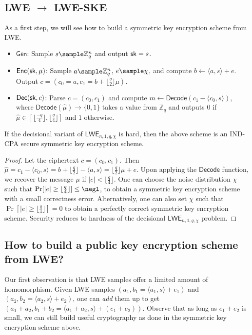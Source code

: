 \documentclass[12pt]{tufte-book}
\newcommand{\Gen}{\mathsf{Gen}}
\newcommand{\Enc}{\mathsf{Enc}}
\newcommand{\Dec}{\mathsf{Dec}}
\newcommand{\LWE}{\mathsf{LWE}} \usepackage{booktabs}
\begin{document}
\subsection{LWE $\to$ LWE-SKE}
As a first step, we will see how to build a symmetric key encryption scheme from LWE.

\begin{itemize}
    \item $\Gen$: Sample $s \sample \mathbb{Z}_q^n$ and output $\mathsf{sk} = s$.
    \item $\Enc(\sk,\mu)$: Sample $a \sample \mathbb{Z}_q^n$, $e \sample \chi$, and compute $b \gets \langle a, s \rangle + e$. Output $c = (c_0 = a, c_1 = b + \lfloor\frac{q}{2}\rfloor\mu)$.
    \item $\Dec(\sk,c)$: Parse $c = (c_0, c_1)$ and compute $m \gets \mathsf{Decode}(c_1 - \langle c_0, s \rangle)$, where $\mathsf{Decode}(\hat{\mu}) \to \{0,1\}$ takes a value from $\mathbb{Z}_q$ and outputs $0$ if $\hat{\mu} \in [\lfloor\frac{-q}{4}\rfloor, \lfloor\frac{q}{4}\rfloor]$ and $1$ otherwise.
\end{itemize}

\begin{theorem}
    If the decisional variant of $\LWE_{n,1,q,\chi}$ is hard, then the above scheme is an IND-CPA secure symmetric key encryption scheme.
\end{theorem}
\begin{proof}
    Let the ciphertext $c = (c_0, c_1)$. Then $\hat{\mu} = c_1 - \langle c_0,s\rangle = b + \lfloor\frac{q}{2}\rfloor - \langle a,s\rangle = \lfloor\frac{q}{2}\rfloor\mu + e$. Upon applying the $\mathsf{Decode}$ function, we recover the message $\mu$ if $|e| < \lfloor\frac{q}{4}\rfloor$.
    One can choose the noise distribution $\chi$ such that
    $\Pr[|e| \geq \lfloor\frac{q}{4}\rfloor] \leq \negl$, to obtain a symmetric key encryption scheme with a small correctness error. Alternatively, one can also set $\chi$ such that $\Pr[|e| \geq \lfloor\frac{q}{4}\rfloor] = 0$ to obtain a perfectly correct symmetric key encryption scheme.
    Security reduces to hardness of the decisional $\LWE_{n,1,q,\chi}$ problem.
\end{proof}

\subsection{How to build a public key encryption scheme from LWE?}
Our first observation is that LWE samples offer a limited amount of homomorphism. Given LWE samples $(a_1, b_1 = \langle a_1, s\rangle + e_1)$ and $(a_2, b_2 = \langle a_2, s\rangle + e_2)$, one can \emph{add} them up to get $(a_1 + a_2, b_1 + b_2 = \langle a_1 + a_2, s\rangle + (e_1+e_2))$. Observe that as long as $e_1 + e_2$ is small, we can still build useful cryptography as done in the symmetric key encryption scheme above.
\end{document}
